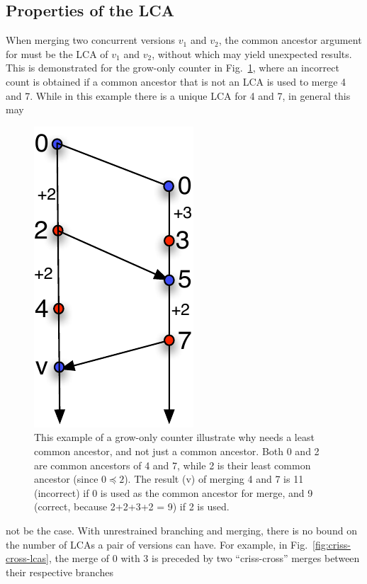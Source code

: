 \subsection{Properties of the LCA}
\label{sec:meta}

When merging two concurrent versions $v_1$ and $v_2$, the common
ancestor argument for  must be the LCA of $v_1$ and $v_2$,
without which  may yield unexpected results. This is
demonstrated for the grow-only counter in
Fig.~\ref{fig:merge-needs-lca}, where an incorrect count is obtained if a
common ancestor that is not an LCA is used to merge 4 and 7. While in
this example there is a unique LCA for 4 and 7, in general this may
\begin{figure}
\centering
\includegraphics[scale=0.6]{Figures/merge-needs-lca}
\caption{This example of a grow-only counter illustrate why 
needs a least common ancestor, and not just a common ancestor. Both 0
and 2 are common ancestors of 4 and 7, while 2 is their least common
ancestor (since $0 \preceq 2$). The result (v) of merging 4 and 7 is
11 (incorrect) if 0 is used as the common ancestor for merge, and 9
(correct, because 2+2+3+2 = 9) if 2 is used. }
\label{fig:merge-needs-lca}
\end{figure}
not be the case. With unrestrained branching and merging, there is no
bound on the number of LCAs a pair of versions can have.  For example,
in Fig.~\ref{fig:criss-cross-lcas}, the merge of 0 with 3 is preceded
by two ``criss-cross'' merges between their respective branches
